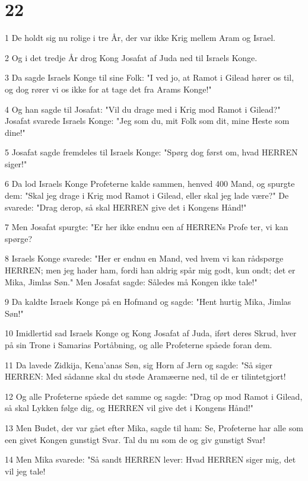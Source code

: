 \chapter{22}

\par 1 De holdt sig nu rolige i tre År, der var ikke Krig mellem Aram og Israel.
\par 2 Og i det tredje År drog Kong Josafat af Juda ned til Israels Konge.
\par 3 Da sagde Israels Konge til sine Folk: "I ved jo, at Ramot i Gilead hører os til, og dog rører vi os ikke for at tage det fra Arams Konge!"
\par 4 Og han sagde til Josafat: "Vil du drage med i Krig mod Ramot i Gilead?" Josafat svarede Israels Konge: "Jeg som du, mit Folk som dit, mine Heste som dine!"
\par 5 Josafat sagde fremdeles til Israels Konge: "Spørg dog først om, hvad HERREN siger!"
\par 6 Da lod Israels Konge Profeterne kalde sammen, henved 400 Mand, og spurgte dem: "Skal jeg drage i Krig mod Ramot i Gilead, eller skal jeg lade være?" De svarede: "Drag derop, så skal HERREN give det i Kongens Hånd!"
\par 7 Men Josafat spurgte: "Er her ikke endnu een af HERRENs Profe ter, vi kan spørge?
\par 8 Israels Konge svarede: "Her er endnu en Mand, ved hvem vi kan rådspørge HERREN; men jeg hader ham, fordi han aldrig spår mig godt, kun ondt; det er Mika, Jimlas Søn." Men Josafat sagde: Således må Kongen ikke tale!"
\par 9 Da kaldte Israels Konge på en Hofmand og sagde: "Hent hurtig Mika, Jimlas Søn!"
\par 10 Imidlertid sad Israels Konge og Kong Josafat af Juda, iført deres Skrud, hver på sin Trone i Samarias Portåbning, og alle Profeterne spåede foran dem.
\par 11 Da lavede Zidkija, Kena'anas Søn, sig Horn af Jern og sagde: "Så siger HERREN: Med sådanne skal du støde Aramæerne ned, til de er tilintetgjort!
\par 12 Og alle Profeterne spåede det samme og sagde: "Drag op mod Ramot i Gilead, så skal Lykken følge dig, og HERREN vil give det i Kongens Hånd!"
\par 13 Men Budet, der var gået efter Mika, sagde til ham: Se, Profeterne har alle som een givet Kongen gunstigt Svar. Tal du nu som de og giv gunstigt Svar!
\par 14 Men Mika svarede: "Så sandt HERREN lever: Hvad HERREN siger mig, det vil jeg tale!
